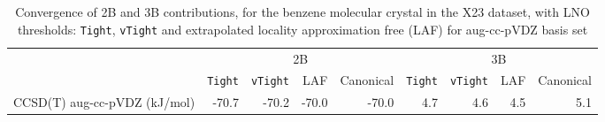 \begin{table}[h]

\caption{\label{tab:benzene_lno_conv}Convergence of 2B and 3B contributions, for the benzene molecular crystal in the X23 dataset, with LNO thresholds: {\tt Tight}, {\tt vTight} and extrapolated locality approximation free (LAF) for aug-cc-pVDZ basis set}
\begin{tabular}{lrrrrrrrr}
\toprule
 & \multicolumn{4}{c}{2B} & \multicolumn{4}{c}{3B} \\ \cmidrule(lr){2-5} \cmidrule(lr){6-9} 
 & {\tt Tight} & {\tt vTight} & LAF & Canonical & {\tt Tight} & {\tt vTight} & LAF & Canonical \\
\midrule
CCSD(T) aug-cc-pVDZ (kJ/mol) & -70.7 & -70.2 & -70.0 & -70.0 & 4.7 & 4.6 & 4.5 & 5.1 \\
\bottomrule
\end{tabular}

\end{table}